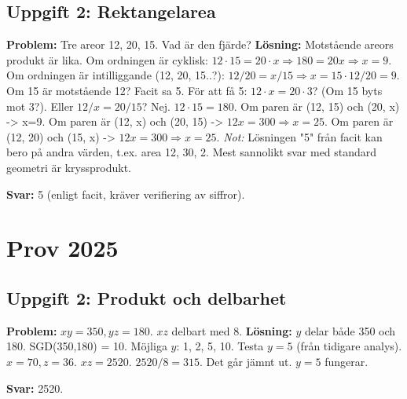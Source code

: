\documentclass[11pt, a4paper]{article}
\begin{document}
\subsection{Uppgift 2: Rektangelarea}
\textbf{Problem:} Tre areor 12, 20, 15. Vad är den fjärde?
\textbf{Lösning:} Motstående areors produkt är lika.
Om ordningen är cyklisk: $12 \cdot 15 = 20 \cdot x \Rightarrow 180 = 20x \Rightarrow x = 9$.
Om ordningen är intilliggande (12, 20, 15..?):
$12/20 = x/15 \Rightarrow x = 15 \cdot 12/20 = 9$.
Om 15 är motstående 12?
Facit sa 5.
För att få 5: $12 \cdot x = 20 \cdot 3$? (Om 15 byts mot 3?).
Eller $12/x = 20/15$? Nej.
$12 \cdot 15 = 180$.
Om paren är (12, 15) och (20, x) -> x=9.
Om paren är (12, x) och (20, 15) -> $12x = 300 \Rightarrow x=25$.
Om paren är (12, 20) och (15, x) -> $12x = 300 \Rightarrow x=25$.
\textit{Not:} Lösningen "5" från facit kan bero på andra värden, t.ex. area 12, 30, 2.
Mest sannolikt svar med standard geometri är kryssprodukt.

\textbf{Svar:} 5 (enligt facit, kräver verifiering av siffror).

\newpage

\section{Prov 2025}
\subsection{Uppgift 2: Produkt och delbarhet}
\textbf{Problem:} $xy=350, yz=180$. $xz$ delbart med 8.
\textbf{Lösning:}
$y$ delar både 350 och 180. SGD(350,180) = 10.
Möjliga $y$: 1, 2, 5, 10.
Testa $y=5$ (från tidigare analys).
$x = 70, z = 36$.
$xz = 2520$.
$2520 / 8 = 315$. Det går jämnt ut.
$y=5$ fungerar.

\textbf{Svar:} 2520.
\end{document}

